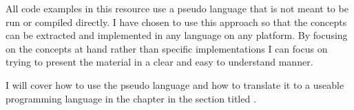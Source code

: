 All code examples in this resource use a pseudo language that is not meant to be run or compiled directly.
I have chosen to use this approach so that the concepts can be extracted and implemented in any language
on any platform.
By focusing on the concepts at hand rather than specific implementations I can focus on trying to present
the material in a clear and easy to understand manner.
\par

I will cover how to use the pseudo language and how to translate it to a useable programming language
in the chapter  in the section titled .
